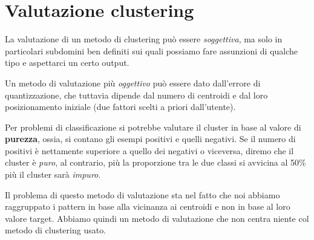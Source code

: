 \section{Valutazione clustering}
La valutazione di un metodo di clustering pu\`o essere \emph{soggettiva}, ma solo in particolari subdomini ben definiti
sui quali possiamo fare assunzioni di qualche tipo e aspettarci un certo output.

Un metodo di valutazione pi\`u \emph{oggettivo} pu\`o essere dato dall'errore di quantizzazione, che tuttavia dipende dal
numero di centroidi e dal loro posizionamento iniziale (due fattori scelti a priori dall'utente).

Per problemi di classificazione si potrebbe valutare il cluster in base al valore di \textbf{purezza}, ossia, si contano
gli esempi positivi e quelli negativi. Se il numero di positivi \`e nettamente superiore a quello dei negativi o viceversa,
diremo che il cluster \`e \emph{puro}, al contrario, pi\`u la proporzione tra le due classi si avvicina al 50\% pi\`u
il cluster sar\`a \emph{impuro}.

Il problema di questo metodo di valutazione sta nel fatto che noi abbiamo raggruppato i pattern in base alla vicinanza
ai centroidi e non in base al loro valore target. Abbiamo quindi un metodo di valutazione che non centra niente col metodo
di clustering usato.